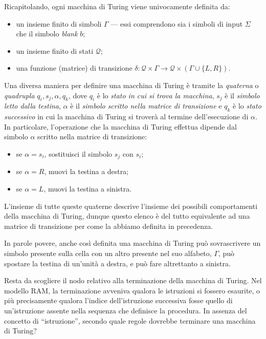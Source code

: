 \documentclass[10pt]{\classname}
\begin{document}
Ricapitolando, ogni macchina di Turing viene univocamente definita da:
\begin{itemize}
    \item un insieme finito di simboli $\Gamma$ --- essi comprendono sia i
        simboli di input $\Sigma$ che il simbolo \emph{blank} $b$;
    \item un insieme finito di stati $\mathcal Q$;
    \item una funzione (matrice) di transizione $\delta  : \mathcal Q \times
        \Gamma \rightarrow \mathcal Q \times (\Gamma \cup \{L,R\})$.
\end{itemize}

Una diversa maniera per definire una macchina di Turing è tramite la
\emph{quaterna} o \emph{quadrupla} $q_i, s_j, \alpha, q_k$, dove $q_i$ è lo
\emph{stato in cui si trova la macchina}, $s_j$ è il \emph{simbolo letto dalla
testina}, $\alpha$ è il \emph{simbolo scritto nella matrice di transizione} e
$q_k$ è lo \emph{stato successivo} in cui la macchina di Turing si troverà al
termine dell'esecuzione di $\alpha$. In particolare, l'operazione che la
macchina di Turing effettua dipende dal simbolo $\alpha$ scritto nella matrice
di transizione:
\begin{itemize}
    \item se $\alpha = s_i$, sostituisci il simbolo $s_j$ con $s_i$;
    \item se $\alpha = R$, muovi la testina a destra;
    \item se $\alpha = L$, muovi la testina a sinistra.
\end{itemize}

L'insieme di tutte queste quaterne descrive l'insieme dei possibili
comportamenti della macchina di Turing, dunque questo elenco è del tutto
equivalente ad una matrice di transizione per come la abbiamo definita in
precedenza.

In parole povere, anche così definita una macchina di Turing può sovrascrivere
un simbolo presente sulla cella con un altro presente nel suo alfabeto,
$\Gamma$, può spostare la testina di un'unità a destra, e può fare altrettanto
a sinistra.

Resta da scogliere il nodo relativo alla terminazione della macchina di Turing.
Nel modello RAM, la terminazione avveniva qualora le istruzioni si fossero
esaurite, o più precisamente qualora l'indice dell'istruzione successiva fosse
quello di un'istruzione assente nella sequenza che definisce la procedura. In
assenza del concetto di ``istruzione'', secondo quale regole dovrebbe terminare
una macchina di Turing? 
\end{document}
